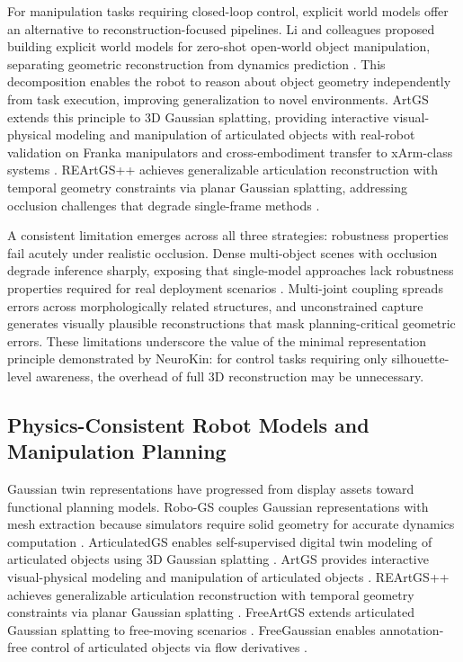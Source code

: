 \documentclass[12pt,a4paper,oneside]{report}
\begin{document}
For manipulation tasks requiring closed-loop control, explicit world models offer an alternative to reconstruction-focused pipelines. Li and colleagues proposed building explicit world models for zero-shot open-world object manipulation, separating geometric reconstruction from dynamics prediction \cite{li2024explicit}. This decomposition enables the robot to reason about object geometry independently from task execution, improving generalization to novel environments. ArtGS extends this principle to 3D Gaussian splatting, providing interactive visual-physical modeling and manipulation of articulated objects with real-robot validation on Franka manipulators and cross-embodiment transfer to xArm-class systems \cite{yu2025artgs}. REArtGS++ achieves generalizable articulation reconstruction with temporal geometry constraints via planar Gaussian splatting, addressing occlusion challenges that degrade single-frame methods \cite{wu2025reartgs}.

A consistent limitation emerges across all three strategies: robustness properties fail acutely under realistic occlusion. Dense multi-object scenes with occlusion degrade inference sharply, exposing that single-model approaches lack robustness properties required for real deployment scenarios \cite{li2025art, zhang2025simart}. Multi-joint coupling spreads errors across morphologically related structures, and unconstrained capture generates visually plausible reconstructions that mask planning-critical geometric errors. These limitations underscore the value of the minimal representation principle demonstrated by NeuroKin: for control tasks requiring only silhouette-level awareness, the overhead of full 3D reconstruction may be unnecessary.

\subsection{Physics-Consistent Robot Models and Manipulation Planning}

Gaussian twin representations have progressed from display assets toward functional planning models. Robo-GS couples Gaussian representations with mesh extraction because simulators require solid geometry for accurate dynamics computation \cite{lou2024robogs}. ArticulatedGS enables self-supervised digital twin modeling of articulated objects using 3D Gaussian splatting \cite{guo2025articulatedgs}. ArtGS provides interactive visual-physical modeling and manipulation of articulated objects \cite{yu2025artgs}. REArtGS++ achieves generalizable articulation reconstruction with temporal geometry constraints via planar Gaussian splatting \cite{wu2025reartgs}. FreeArtGS extends articulated Gaussian splatting to free-moving scenarios \cite{dai2025freeartgs}. FreeGaussian enables annotation-free control of articulated objects via flow derivatives \cite{chen2025freegaussian}.
\end{document}
